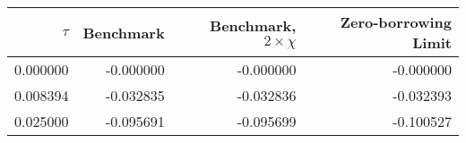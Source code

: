 \begin{tabular}{rrrr}
\toprule
   $\tau$ &  Benchmark &  Benchmark, $2 \times \chi$ &  Zero-borrowing Limit \\
\midrule
 0.000000 &  -0.000000 &                   -0.000000 &             -0.000000 \\
 0.008394 &  -0.032835 &                   -0.032836 &             -0.032393 \\
 0.025000 &  -0.095691 &                   -0.095699 &             -0.100527 \\
\bottomrule
\end{tabular}
